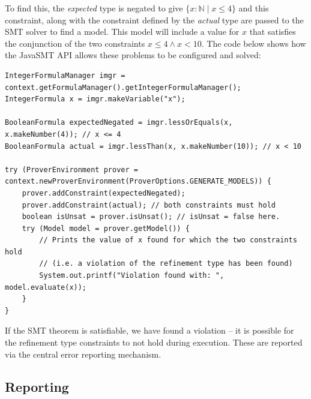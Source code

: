 \documentclass[a4paper]{article}
\begin{document}
    To find this, the \emph{expected} type is negated to give $\{x: \mathbb{N} \mid{} x \le 4\}$ and this constraint, along with the constraint defined by the \emph{actual} type are passed to the SMT solver to find a model. This model will include a value for $x$ that satisfies the conjunction of the two constraints $x \le 4 \land x < 10$. The code below shows how the JavaSMT API allows these problems to be configured and solved:
    
    \begin{verbatim}
IntegerFormulaManager imgr = context.getFormulaManager().getIntegerFormulaManager();
IntegerFormula x = imgr.makeVariable("x");

BooleanFormula expectedNegated = imgr.lessOrEquals(x, x.makeNumber(4)); // x <= 4
BooleanFormula actual = imgr.lessThan(x, x.makeNumber(10)); // x < 10

try (ProverEnvironment prover = context.newProverEnvironment(ProverOptions.GENERATE_MODELS)) {
    prover.addConstraint(expectedNegated);
    prover.addConstraint(actual); // both constraints must hold
    boolean isUnsat = prover.isUnsat(); // isUnsat = false here.
    try (Model model = prover.getModel()) {
        // Prints the value of x found for which the two constraints hold
        // (i.e. a violation of the refinement type has been found)
        System.out.printf("Violation found with: ", model.evaluate(x));
    }
}
    \end{verbatim}
    
    If the SMT theorem is satisfiable, we have found a violation -- it is possible for the refinement type constraints to not hold during execution. These are reported via the central error reporting mechanism.
    
    \subsection*{Reporting}
    
    \hfill{}
\end{document}
